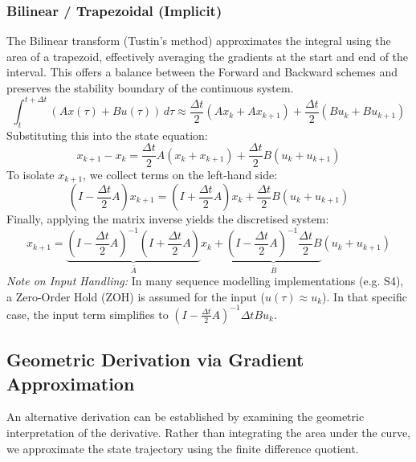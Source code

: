 \documentclass[a4paper,11pt]{article}
\begin{document}
\subsubsection{Bilinear / Trapezoidal (Implicit)}
The Bilinear transform (Tustin's method) approximates the integral using the area of a trapezoid, effectively averaging the gradients at the start and end of the interval. This offers a balance between the Forward and Backward schemes and preserves the stability boundary of the continuous system.
\begin{equation}
    \int_{t}^{t+\Delta t} (A x(\tau) + B u(\tau)) \, d\tau \approx \frac{\Delta t}{2} (A x_k + A x_{k+1}) + \frac{\Delta t}{2} (B u_k + B u_{k+1})
\end{equation}
Substituting this into the state equation:
\begin{equation}
    x_{k+1} - x_k = \frac{\Delta t}{2} A (x_k + x_{k+1}) + \frac{\Delta t}{2} B (u_k + u_{k+1})
\end{equation}
To isolate $x_{k+1}$, we collect terms on the left-hand side:
\begin{equation}
    \left( I - \frac{\Delta t}{2} A \right) x_{k+1} = \left( I + \frac{\Delta t}{2} A \right) x_k + \frac{\Delta t}{2} B (u_k + u_{k+1})
\end{equation}
Finally, applying the matrix inverse yields the discretised system:
\begin{equation}
    x_{k+1} = \underbrace{\left( I - \frac{\Delta t}{2} A \right)^{-1} \left( I + \frac{\Delta t}{2} A \right)}_{\overline{A}} x_k + \underbrace{\left( I - \frac{\Delta t}{2} A \right)^{-1} \frac{\Delta t}{2} B}_{\overline{B}} (u_k + u_{k+1})
\end{equation}
\textit{Note on Input Handling:} In many sequence modelling implementations (e.g. S4), a Zero-Order Hold (ZOH) is assumed for the input ($u(\tau) \approx u_k$). In that specific case, the input term simplifies to $(I - \frac{\Delta t}{2} A)^{-1} \Delta t B u_k$.



\subsection{Geometric Derivation via Gradient Approximation}
\label{sec:geometric_derivation}

An alternative derivation can be established by examining the geometric interpretation of the derivative. Rather than integrating the area under the curve, we approximate the state trajectory using the finite difference quotient.
\end{document}
